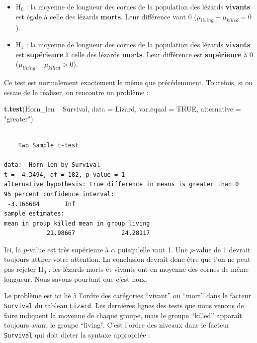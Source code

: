 \documentclass[a4paperpaper,]{article}
\newenvironment{Shaded}{\begin{snugshade}}{\end{snugshade}}
\newcommand{\DataTypeTok}[1]{\textcolor[rgb]{0.00,0.34,0.68}{#1}}
\newcommand{\KeywordTok}[1]{\textcolor[rgb]{0.12,0.11,0.11}{\textbf{#1}}}
\newcommand{\NormalTok}[1]{\textcolor[rgb]{0.12,0.11,0.11}{#1}}
\newcommand{\OperatorTok}[1]{\textcolor[rgb]{0.12,0.11,0.11}{#1}}
\newcommand{\OtherTok}[1]{\textcolor[rgb]{0.00,0.43,0.16}{#1}}
\newcommand{\StringTok}[1]{\textcolor[rgb]{0.75,0.01,0.01}{#1}}
\providecommand{\tightlist}{%
  \setlength{\itemsep}{0pt}\setlength{\parskip}{0pt}}
\begin{document}
\begin{itemize}
\tightlist
\item
  H\(_0\) : la moyenne de longueur des cornes de la population des lézards \textbf{vivants} est égale à celle des lézards \textbf{morts}. Leur différence vaut 0 (\(\mu_{living}-\mu_{killed} = 0\)).
\item
  H\(_1\) : la moyenne de longueur des cornes de la population des lézards \textbf{vivants} est \textbf{supérieure} à celle des lézards \textbf{morts}. Leur différence est \textbf{supérieure} à 0 (\(\mu_{living}-\mu_{killed} > 0\)).
\end{itemize}

Ce test est normalement exactement le même que précédemment. Toutefois, si on essaie de le réaliser, on rencontre un problème :

\begin{Shaded}
\begin{Highlighting}[]
\KeywordTok{t.test}\NormalTok{(Horn_len }\OperatorTok{~}\StringTok{ }\NormalTok{Survival, }
       \DataTypeTok{data =}\NormalTok{ Lizard, }\DataTypeTok{var.equal =} \OtherTok{TRUE}\NormalTok{,}
       \DataTypeTok{alternative =} \StringTok{"greater"}\NormalTok{)}
\end{Highlighting}
\end{Shaded}

\begin{verbatim}

    Two Sample t-test

data:  Horn_len by Survival
t = -4.3494, df = 182, p-value = 1
alternative hypothesis: true difference in means is greater than 0
95 percent confidence interval:
 -3.166684       Inf
sample estimates:
mean in group killed mean in group living 
            21.98667             24.28117 
\end{verbatim}

Ici, la \(p\)-value est très supérieure à \(\alpha\) puisqu'elle vaut 1. Une \(p\)-value de 1 devrait toujours attirer votre attention. La conclusion devrait donc être que l'on ne peut pas rejeter H\(_0\) : les lézards morts et vivants ont en moyenne des cornes de même longueur. Nous savons pourtant que c'est faux.

Le problème est ici liè à l'ordre des catégories ``vivant'' ou ``mort'' dans le facteur \texttt{Survival} du tableau \texttt{Lizard}. Les dernières lignes des tests que nous venons de faire indiquent la moyenne de chaque groupe, mais le groupe ``killed'' apparaît toujours avant le groupe ``living''. C'est l'ordre des niveaux dans le facteur \texttt{Survival} qui doit dicter la syntaxe appropriée :
\end{document}
